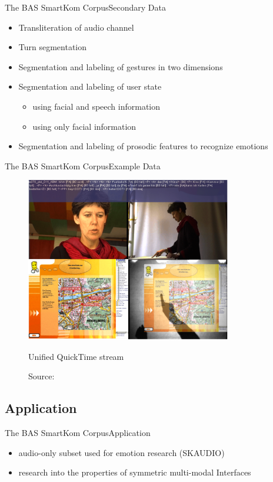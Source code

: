 \documentclass{beamer}
\begin{document}
		\begin{frame}{The BAS SmartKom Corpus}{Secondary Data}
			\begin{itemize}
				\item Transliteration of audio channel 
				\item Turn segmentation
				\item Segmentation and labeling of gestures in two dimensions
				\item Segmentation and labeling of user state
				\begin{itemize}
					\item using facial and speech information
					\item using only facial information 
				\end{itemize}
				\item Segmentation and labeling of prosodic features to recognize emotions
			\end{itemize}
		\end{frame}
		\begin{frame}{The BAS SmartKom Corpus}{Example Data}
		\begin{figure}
			\includegraphics[width=0.8\textwidth]{images/BAS/stream}
			\caption{Unified QuickTime stream}
			\vspace*{-10pt}
			\caption*{Source: \cite{basSKP}}	
			\end{figure}		
		\end{frame}
		
		\subsection{Application}
			\begin{frame}{The BAS SmartKom Corpus}{Application}
				\begin{itemize}
					\item audio-only subset used for emotion research (SKAUDIO)
					\item research into the properties of symmetric multi-modal Interfaces\cite{wahlster2003towards}
				\end{itemize}
			\end{frame}	
	
\end{document}
